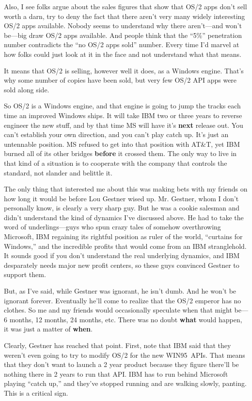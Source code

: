 Also, I see folks argue about the sales figures
that show that OS/2 apps don't sell worth a darn, try to deny the fact that
there aren't very many widely interesting OS/2 apps available.  Nobody
seems to understand why there aren't---and won't be---big draw OS/2 apps
available.  And people think that the ``5\%'' penetration number contradicts
the ``no OS/2 apps sold'' number.  Every time I'd marvel at how folks
could just look at it in the face and not understand what that means.

It means that OS/2 is selling, however well it does, as a Windows engine.
That's why some number of copies have been sold, but very few OS/2
API apps were sold along side.

So OS/2 is a Windows engine, 
and that engine is going to jump the tracks each time an improved
Windows ships.  It will take IBM two or three years to reverse engineer
the new stuff, and by that time MS will have it's {\bf next} release out.
You can't establish your own direction, and you can't play catch up.
It's just an untennable position.  MS refused to get into that position
with AT\&T, yet IBM burned all of its other bridges {\bf before} it crossed
them.  The only way to live in that kind of a situation is to cooperate
with the company that controls the standard, not slander and belittle it.

The only thing that interested me about this was making bets with my friends 
on how long it would be before Lou Gestner wised up.  Mr. Gestner, whom
I don't personally know, is clearly a very sharp guy.  But he was a
cookie salesman and didn't understand the kind of dynamics I've discussed
above.  He had to take the word of underlings---guys who spun crazy
tales of somehow overthrowing Microsoft, IBM regaining its rightful
position as ruler of the world, ``curtains for Windows,'' and the 
incredible profits that would come from an IBM stranglehold.  It sounds
good if you don't understand the real underlying dynamics, and IBM
desparately needs major new profit centers, so these guys convinced
Gestner to support them.  

But, as I've said, while Gestner was ignorant, he isn't dumb.  And he
won't be ignorant forever.  Eventually he'll come to realize that
the OS/2 emperor has no clothes.  So me and my friends would occasionally
speculate when that might be---6 months, 12 months, 24 months, etc.
There was no doubt {\bf what} would happen, it was just a matter of
{\bf when}.

Clearly, Gestner has reached that point.  First, note that IBM said that
they weren't even going to try to modify OS/2 for the new WIN95~APIs.
That means that they don't want to launch a 2 year product because
they figure there'll be nothing there in 2 years to run that API\hbox{}.
IBM has to run behind Microsoft playing ``catch up,'' and they've stopped
running and are walking slowly, panting.  This is a critical sign.

